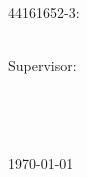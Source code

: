 \documentclass[11pt,
            english,
            oneside,
            liststotoc,
            singlespacing,
            headsepline,
            consistentlayout]{style}
\author{Lester James V. Miranda}
\theoremstyle{definition}
\begin{document}
\frontmatter

\pagestyle{plain}


\begin{titlepage}
\begin{center}
\vspace*{.02\textheight}
{\LARGE \bfseries \ttitle}\vspace{2.5cm} %

{\Large 44161652-3: \authorname} %
\vfill 

{\normalsize \degreename} \\[2.5cm] %

{\normalsize Supervisor: \supname} \\[2.5cm] %

{\normalsize \groupname} \\        %
{\normalsize \facname}   \\        %
{\normalsize \deptname}  \\[0.5cm] %

{\normalsize \univname} \\[0.5cm] %

{\normalsize \today} %
\end{center}
\end{titlepage}
\end{document}
